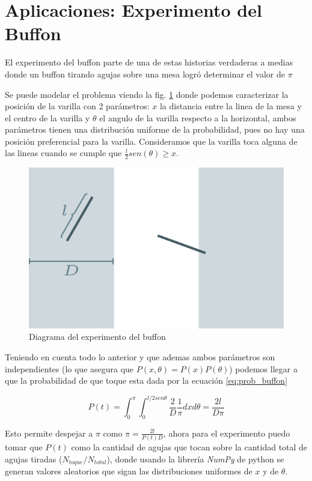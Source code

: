 \documentclass[baaa]{baaa}
\begin{document}
\section{Aplicaciones: Experimento del Buffon}
El experimento del buffon parte de una de estas historias verdaderas a medias donde un buffon tirando agujas sobre una mesa logró determinar el valor de $\pi$

Se puede modelar el problema viendo la fig. \ref{fig:buffon_exp} donde podemos caracterizar la posición de la varilla con 2 parámetros: $x$ la distancia entre la linea de la mesa y el centro de la varilla y $\theta$ el angulo de la varilla respecto a la horizontal, ambos parámetros tienen una distribución uniforme de la probabilidad, pues no hay una posición preferencial para la varilla. 
Consideramos que la varilla toca alguna de las lineas  cuando se cumple que $\frac{l}{2}sen(\theta)\geq x$.
\begin{figure}[h]
    \centering
    \includegraphics[width=\linewidth]{imagenes/buffon-1-1.png}
    \caption{Diagrama del experimento del buffon}
    \label{fig:buffon_exp}
\end{figure}

Teniendo en cuenta todo lo anterior y que ademas ambos parámetros son independientes (lo que asegura que $P(x,\theta)=P(x)P(\theta)$) podemos llegar a que la probabilidad de que toque esta dada por la ecuación \ref{eq:prob_buffon}

\begin{equation}
    P(t)=\int_{0}^{\pi}\int_{0}^{l/2sen\theta} \frac{2}{D}\frac{1}{\pi}dxd\theta=\frac{2l}{D\pi}
\label{eq:prob_buffon}
\end{equation}

Esto permite despejar a $\pi$ como $\pi= \frac{2l}{P(t)D}$, ahora para el experimento puedo tomar que $P(t)$ como la cantidad de agujas que tocan sobre la cantidad total de agujas tiradas ($N_{toque}/N_{total}$), donde usando la librería \textit{NumPy} de python se generan valores aleatorios que sigan las distribuciones uniformes de $x$ y de $\theta$. 
\end{document}
